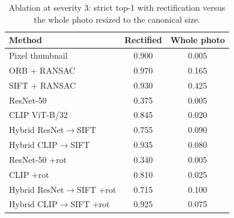 \begin{table}[htbp]\centering\small
\caption[Rectification ablation]{Ablation at severity 3: strict top-1 with rectification versus the whole photo resized to the canonical size.}\label{tab:norectify}
\begin{tabular}{@{}lcc@{}}
\toprule
Method & Rectified & Whole photo\\
\midrule
Pixel thumbnail & 0.900 & 0.005\\
ORB + RANSAC & 0.970 & 0.165\\
SIFT + RANSAC & 0.930 & 0.425\\
ResNet-50 & 0.375 & 0.005\\
CLIP ViT-B/32 & 0.845 & 0.020\\
Hybrid ResNet$\to$SIFT & 0.755 & 0.090\\
Hybrid CLIP$\to$SIFT & 0.935 & 0.080\\
ResNet-50 +rot & 0.340 & 0.005\\
CLIP +rot & 0.810 & 0.025\\
Hybrid ResNet$\to$SIFT +rot & 0.715 & 0.100\\
Hybrid CLIP$\to$SIFT +rot & 0.925 & 0.075\\
\bottomrule
\end{tabular}
\end{table}
